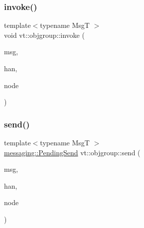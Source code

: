 \mbox{\label{namespacevt_1_1objgroup_aee19dffbee9f43f1a28d08f1c07996c7}} 
\subsubsection{\texorpdfstring{invoke()}{invoke()}}
{\footnotesize\ttfamily template$<$typename MsgT $>$ \\
void vt\+::objgroup\+::invoke (\begin{DoxyParamCaption}\item[{\hyperlink{structvt_1_1messaging_1_1_msg_ptr_thief}{messaging\+::\+Msg\+Ptr\+Thief}$<$ MsgT $>$}]{msg,  }\item[{\hyperlink{namespacevt_af64846b57dfcaf104da3ef6967917573}{Handler\+Type}}]{han,  }\item[{\hyperlink{namespacevt_a866da9d0efc19c0a1ce79e9e492f47e2}{Node\+Type}}]{node }\end{DoxyParamCaption})}

\mbox{\label{namespacevt_1_1objgroup_a6efc2df6997b609c551848af332cfb15}} 
\subsubsection{\texorpdfstring{send()}{send()}}
{\footnotesize\ttfamily template$<$typename MsgT $>$ \\
\hyperlink{structvt_1_1messaging_1_1_pending_send}{messaging\+::\+Pending\+Send} vt\+::objgroup\+::send (\begin{DoxyParamCaption}\item[{\hyperlink{namespacevt_ab2b3d506ec8e8d1540aede826d84a239}{Msg\+Shared\+Ptr}$<$ MsgT $>$}]{msg,  }\item[{\hyperlink{namespacevt_af64846b57dfcaf104da3ef6967917573}{Handler\+Type}}]{han,  }\item[{\hyperlink{namespacevt_a866da9d0efc19c0a1ce79e9e492f47e2}{Node\+Type}}]{node }\end{DoxyParamCaption})}

